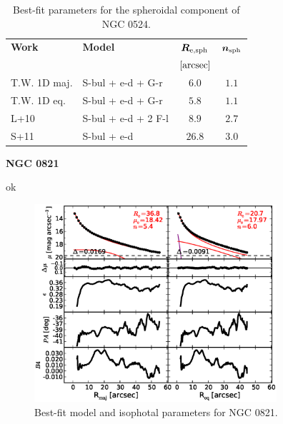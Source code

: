\documentclass[preprint2]{emulateapj}
\newcommand{\fitfigurewidth}{0.8\textwidth}
\begin{document}
  \begin{table}[h]
  \small
  \caption{Best-fit parameters for the spheroidal component of NGC 0524.}
  \begin{center}
  \begin{tabular}{llcc}
  \hline
  {\bf Work} & {\bf Model}   & $\bm R_{\rm e,sph}$    & $\bm n_{\rm sph}$ \\
    &  &  $[\rm arcsec]$ & \\
  \hline
  T.W. 1D maj. & S-bul + e-d + G-r & $6.0$  &  $1.1$ \\
  T.W. 1D eq.  & S-bul + e-d + G-r & $5.8$  &  $1.1$ \\
  \hline
  L+10      & S-bul + e-d + 2 F-l & $8.9$  &  $2.7$ \\
  S+11      & S-bul + e-d	  & $26.8$  &  $3.0$ \\
  \hline
  \end{tabular}
  \end{center}
  \label{tab:n0524}
  \end{table}


  \clearpage\newpage\noindent

  {\bf NGC 0821 \\}

  ok

  \begin{figure}[h]
  \begin{center}
  \includegraphics[width=\fitfigurewidth]{images/n0821_1Dfit.eps}
  \caption{Best-fit model and isophotal parameters for NGC 0821.}
  \end{center}
  \end{figure}
\end{document}
